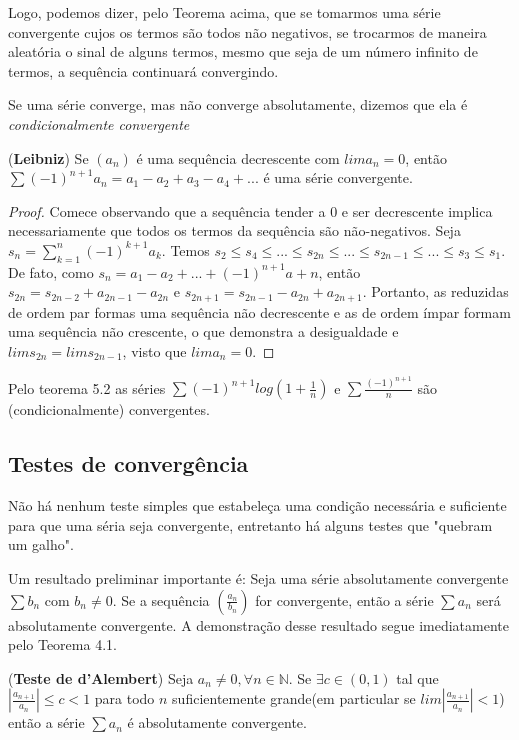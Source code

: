 Logo, podemos dizer, pelo Teorema acima, que se tomarmos uma série convergente cujos os termos são todos não negativos, se trocarmos de maneira aleatória o sinal de alguns termos, mesmo que seja de um número infinito de termos, a sequência continuará convergindo.

Se uma série converge, mas não converge absolutamente, dizemos que ela é \textit{condicionalmente convergente}

\begin{theorem}(\textbf{Leibniz})
Se $(a_{n})$ é uma sequência decrescente com $lim a_{n}=0$, então $\sum (-1)^{n+1}a_{n}=a_{1}-a_{2}+a_{3}-a_{4}+...$ é uma série convergente.
\end{theorem}
\begin{proof}
Comece observando que a sequência tender a 0 e ser decrescente implica necessariamente que todos os termos da sequência são não-negativos. Seja $s_{n}=\sum_{k=1}^{n}(-1)^{k+1}a_{k}$. Temos $s_{2} \leq s_{4} \leq ... \leq s_{2n}\leq...\leq s_{2n-1}\leq...\leq s_{3} \leq s_{1}$. De fato, como $s_{n}=a_{1}-a_{2}+...+(-1)^{n+1}a+{n}$, então $s_{2n}=s_{2n-2}+a_{2n-1}-a_{2n}$ e $s_{2n+1}=s_{2n-1}-a_{2n}+a_{2n+1}$. Portanto, as reduzidas de ordem par formas uma sequência não decrescente e as de ordem ímpar formam uma sequência não crescente, o que demonstra a desigualdade e $lim s_{2n}=lim s_{2n-1}$, visto que $lim a_{n}=0$.
\end{proof}

\begin{exem}
Pelo teorema 5.2 as séries $\sum(-1)^{n+1}log(1+\frac{1}{n})$ e $\sum \frac{(-1)^{n+1}}{n}$ são (condicionalmente) convergentes.
\end{exem}

\subsection{Testes de convergência}
Não há nenhum teste simples que estabeleça uma condição necessária e suficiente para que uma séria seja convergente, entretanto há alguns testes que "quebram um galho".

Um resultado preliminar importante é: Seja uma série absolutamente convergente $\sum b_{n}$ com $b_{n} \neq0$. Se a sequência $(\frac{a_{n}}{b_{n}})$ for convergente, então a série $\sum a_{n}$ será absolutamente convergente. A demonstração desse resultado segue imediatamente pelo Teorema 4.1.

\begin{theorem}(\textbf{Teste de d'Alembert})
Seja $a_{n}\neq 0, \forall n \in \mathbb{N}$. Se $\exists c \in (0,1)$ tal que $|\frac{a_{n+1}}{a_{n}}|\leq c<1$ para todo $n$ suficientemente grande(em particular se $lim|\frac{a_{n+1}}{a_{n}}|<1$) então a série $\sum a_{n}$ é absolutamente convergente.
\end{theorem}

